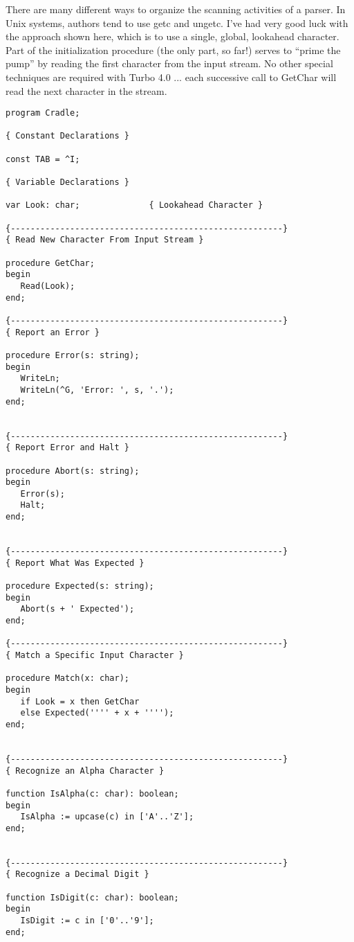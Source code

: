 There are many different ways to organize the scanning activities
of  a  parser.   In Unix systems, authors tend to  use  getc  and
ungetc.  I've had very good luck with the  approach  shown  here,
which is to use  a  single, global, lookahead character.  Part of
the initialization procedure  (the  only part, so far!) serves to
``prime  the  pump''  by reading the first character from the input
stream.  No other special  techniques are required with Turbo 4.0
... each successive call to  GetChar will read the next character
in the stream.


\begin{verbatim}
program Cradle;

{ Constant Declarations }

const TAB = ^I;

{ Variable Declarations }

var Look: char;              { Lookahead Character }

{-------------------------------------------------------}
{ Read New Character From Input Stream }

procedure GetChar;
begin
   Read(Look);
end;

{-------------------------------------------------------}
{ Report an Error }

procedure Error(s: string);
begin
   WriteLn;
   WriteLn(^G, 'Error: ', s, '.');
end;


{-------------------------------------------------------}
{ Report Error and Halt }

procedure Abort(s: string);
begin
   Error(s);
   Halt;
end;


{-------------------------------------------------------}
{ Report What Was Expected }

procedure Expected(s: string);
begin
   Abort(s + ' Expected');
end;

{-------------------------------------------------------}
{ Match a Specific Input Character }

procedure Match(x: char);
begin
   if Look = x then GetChar
   else Expected('''' + x + '''');
end;


{-------------------------------------------------------}
{ Recognize an Alpha Character }

function IsAlpha(c: char): boolean;
begin
   IsAlpha := upcase(c) in ['A'..'Z'];
end;


{-------------------------------------------------------}
{ Recognize a Decimal Digit }

function IsDigit(c: char): boolean;
begin
   IsDigit := c in ['0'..'9'];
end;



\end{verbatim}
